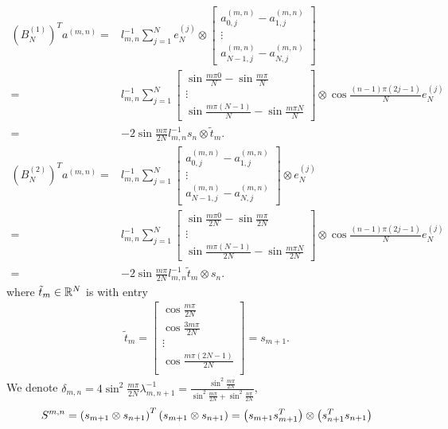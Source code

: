 \documentclass[english]{pkupaper}
\newenvironment{eqt}{\begin{equation}\begin{aligned}}{\end{aligned}\end{equation}}
\begin{document}
\begin{eqt}
(B_N^{(1)})^Ta^{(m,n)}=&l_{m,n}^{-1}\sum_{j=1}^Ne_N^{(j)} \otimes \begin{bmatrix}
a^{(m,n)}_{0,j}-a^{(m,n)}_{1,j}\\
\vdots\\
a^{(m,n)}_{N-1,j}-a^{(m,n)}_{N,j}
\end{bmatrix} \\
=&l_{m,n}^{-1}\sum_{j=1}^N\begin{bmatrix}
\sin\frac{m\pi0}{N}-\sin\frac{m\pi}{N}\\
\vdots\\
\sin\frac{m\pi (N-1)}{N}-\sin\frac{m\pi N}{N}
\end{bmatrix}\otimes \cos\frac{(n-1)\pi(2j-1)}{N}e_N^{(j)}\\
=&-2\sin\frac{m\pi}{2N}l_{m,n}^{-1}s_n\otimes \tilde t_m.
\end{eqt}
\begin{eqt}
(B_N^{(2)})^Ta^{(m,n)}=&l_{m,n}^{-1}\sum_{j=1}^N\begin{bmatrix}
a^{(m,n)}_{0,j}-a^{(m,n)}_{1,j}\\
\vdots\\
a^{(m,n)}_{N-1,j}-a^{(m,n)}_{N,j}
\end{bmatrix}  \otimes e_N^{(j)} \\
=&l_{m,n}^{-1}\sum_{j=1}^N\begin{bmatrix}
\sin\frac{m\pi0}{2N}-\sin\frac{m\pi}{2N}\\
\vdots\\
\sin\frac{m\pi (N-1)}{2N}-\sin\frac{m\pi N}{2N}
\end{bmatrix}\otimes \cos\frac{(n-1)\pi(2j-1)}{N}e_N^{(j)}\\
=&-2\sin\frac{m\pi}{2N}l_{m,n}^{-1}\tilde t_m\otimes s_n.
\end{eqt}
where $\tilde t_m\in \mathbb{R}^{N}$ is with entry
\begin{eqt}\tilde t_m=\begin{bmatrix}
\cos \frac{m\pi}{2N}\\
\cos \frac{3m\pi}{2N}\\
\vdots\\
\cos \frac{m\pi(2N-1)}{2N}\\
\end{bmatrix}=s_{m+1}.
\end{eqt}
We denote $\delta_{m,n}=4\sin^2\frac{m\pi}{2N}\lambda_{m,n+1}^{-1}=\frac{\sin^2\frac{m\pi}{2N}}{\sin^2\frac{m\pi}{2N}+\sin^2\frac{n\pi}{2N}}$, 
\begin{eqt}S^{m,n}=\lp s_{m+1}\otimes s_{n+1}\rp^T\lp s_{m+1}\otimes s_{n+1}\rp=\lp s_{m+1}s_{m+1}^T\rp\otimes \lp s_{n+1}^T s_{n+1}\rp
\end{eqt}
\end{document}
